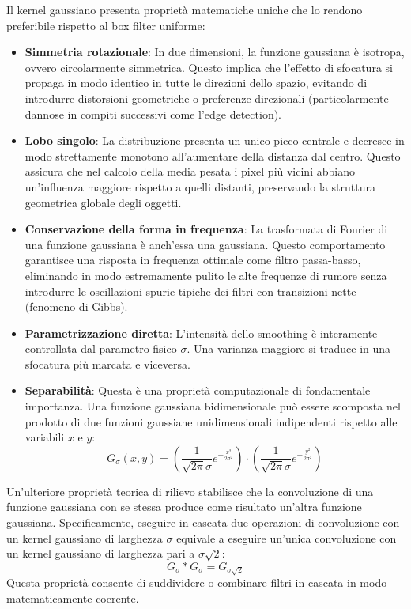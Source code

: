 ﻿\documentclass[11pt, a4paper]{article}
\begin{document}
Il kernel gaussiano presenta proprietà matematiche uniche che lo rendono preferibile rispetto al box filter uniforme:
\begin{itemize}
    \item \textbf{Simmetria rotazionale}: In due dimensioni, la funzione gaussiana è isotropa, ovvero circolarmente simmetrica. Questo implica che l'effetto di sfocatura si propaga in modo identico in tutte le direzioni dello spazio, evitando di introdurre distorsioni geometriche o preferenze direzionali (particolarmente dannose in compiti successivi come l'edge detection).
    \item \textbf{Lobo singolo}: La distribuzione presenta un unico picco centrale e decresce in modo strettamente monotono all'aumentare della distanza dal centro. Questo assicura che nel calcolo della media pesata i pixel più vicini abbiano un'influenza maggiore rispetto a quelli distanti, preservando la struttura geometrica globale degli oggetti.
    \item \textbf{Conservazione della forma in frequenza}: La trasformata di Fourier di una funzione gaussiana è anch'essa una gaussiana. Questo comportamento garantisce una risposta in frequenza ottimale come filtro passa-basso, eliminando in modo estremamente pulito le alte frequenze di rumore senza introdurre le oscillazioni spurie tipiche dei filtri con transizioni nette (fenomeno di Gibbs).
    \item \textbf{Parametrizzazione diretta}: L'intensità dello smoothing è interamente controllata dal parametro fisico $\sigma$. Una varianza maggiore si traduce in una sfocatura più marcata e viceversa.
    \item \textbf{Separabilità}: Questa è una proprietà computazionale di fondamentale importanza. Una funzione gaussiana bidimensionale può essere scomposta nel prodotto di due funzioni gaussiane unidimensionali indipendenti rispetto alle variabili $x$ e $y$:
    \[ G_{\sigma}(x, y) = \left( \frac{1}{\sqrt{2\pi}\sigma} e^{-\frac{x^2}{2\sigma^2}} \right) \cdot \left( \frac{1}{\sqrt{2\pi}\sigma} e^{-\frac{y^2}{2\sigma^2}} \right) \]
\end{itemize}

Un'ulteriore proprietà teorica di rilievo stabilisce che la convoluzione di una funzione gaussiana con se stessa produce come risultato un'altra funzione gaussiana. Specificamente, eseguire in cascata due operazioni di convoluzione con un kernel gaussiano di larghezza $\sigma$ equivale a eseguire un'unica convoluzione con un kernel gaussiano di larghezza pari a $\sigma\sqrt{2}$:
\[ G_{\sigma} * G_{\sigma} = G_{\sigma\sqrt{2}} \]
Questa proprietà consente di suddividere o combinare filtri in cascata in modo matematicamente coerente.
\end{document}
